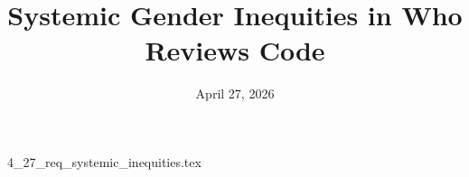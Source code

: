 \documentclass{article}      %
\title{Systemic Gender Inequities in Who Reviews Code}  %
\date{April 27, 2026}
\begin{document}

\maketitle                   %



{4_27_req_systemic_inequities.tex}
\end{document}
